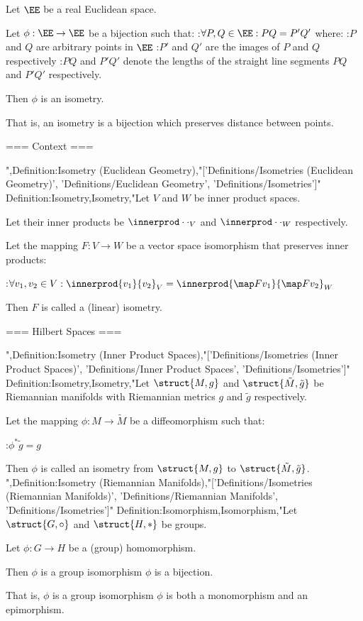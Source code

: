 Let $\EE$ be a real Euclidean space.


Let $\phi: \EE \to \EE$ be a bijection such that:
:$\forall P, Q \in \EE: PQ = P'Q'$
where:
:$P$ and $Q$ are arbitrary points in $\EE$
:$P'$ and $Q'$ are the images of $P$ and $Q$ respectively
:$PQ$ and $P'Q'$ denote the lengths of the straight line segments $PQ$ and $P'Q'$ respectively.


Then $\phi$ is an isometry.


That is, an isometry is a bijection which preserves distance between points.


=== Context ===

",Definition:Isometry (Euclidean Geometry),"['Definitions/Isometries (Euclidean Geometry)', 'Definitions/Euclidean Geometry', 'Definitions/Isometries']"
Definition:Isometry,Isometry,"Let $V$ and $W$ be inner product spaces.

Let their inner products be $\innerprod \cdot \cdot_V$ and $\innerprod \cdot \cdot_W$ respectively.

Let the mapping $F : V \to W$ be a vector space isomorphism that preserves inner products:

:$\forall v_1, v_2 \in V : \innerprod {v_1} {v_2}_V = \innerprod {\map F {v_1}} {\map F {v_2}}_W$


Then $F$ is called a (linear) isometry.


=== Hilbert Spaces ===

",Definition:Isometry (Inner Product Spaces),"['Definitions/Isometries (Inner Product Spaces)', 'Definitions/Inner Product Spaces', 'Definitions/Isometries']"
Definition:Isometry,Isometry,"Let $\struct {M, g}$ and $\struct {\tilde M, \tilde g}$ be Riemannian manifolds with Riemannian metrics $g$ and $\tilde g$ respectively.

Let the mapping $\phi : M \to \tilde M$ be a diffeomorphism such that:

:$\phi^* \tilde g = g$


Then $\phi$ is called an isometry from $\struct {M, g}$ to $\struct {\tilde M, \tilde g}$.
",Definition:Isometry (Riemannian Manifolds),"['Definitions/Isometries (Riemannian Manifolds)', 'Definitions/Riemannian Manifolds', 'Definitions/Isometries']"
Definition:Isomorphism,Isomorphism,"Let $\struct {G, \circ}$ and $\struct {H, *}$ be groups.

Let $\phi: G \to H$ be a (group) homomorphism.


Then $\phi$ is a group isomorphism  $\phi$ is a bijection.


That is, $\phi$ is a group isomorphism  $\phi$ is both a monomorphism and an epimorphism.


